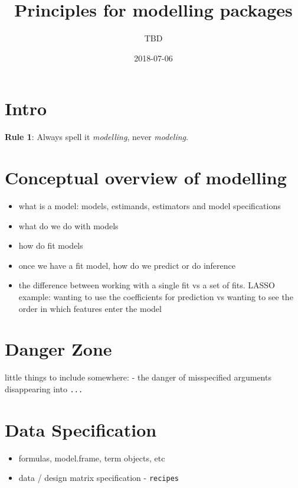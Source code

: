 \documentclass[]{book}
\title{Principles for modelling packages}
\author{TBD}
\date{2018-07-06}
\theoremstyle{definition}
\theoremstyle{definition}
\theoremstyle{definition}
\theoremstyle{remark}
\begin{document}
\maketitle

{
\setcounter{tocdepth}{1}
\tableofcontents
}
\chapter{Intro}\label{intro}

\textbf{Rule 1}: Always spell it \emph{modelling}, never
\emph{modeling}.

\chapter{Conceptual overview of
modelling}\label{conceptual-overview-of-modelling}

\begin{itemize}
\item
  what is a model: models, estimands, estimators and model
  specifications
\item
  what do we do with models
\item
  how do fit models
\item
  once we have a fit model, how do we predict or do inference
\item
  the difference between working with a single fit vs a set of fits.
  LASSO example: wanting to use the coefficients for prediction vs
  wanting to see the order in which features enter the model
\end{itemize}

\chapter{Danger Zone}\label{danger-zone}

little things to include somewhere: - the danger of misspecified
arguments disappearing into \texttt{...}

\chapter{Data Specification}\label{data-specification}

\begin{itemize}
\item
  formulas, model.frame, term objects, etc
\item
  data / design matrix specification - \texttt{recipes}
\end{itemize}
\end{document}
